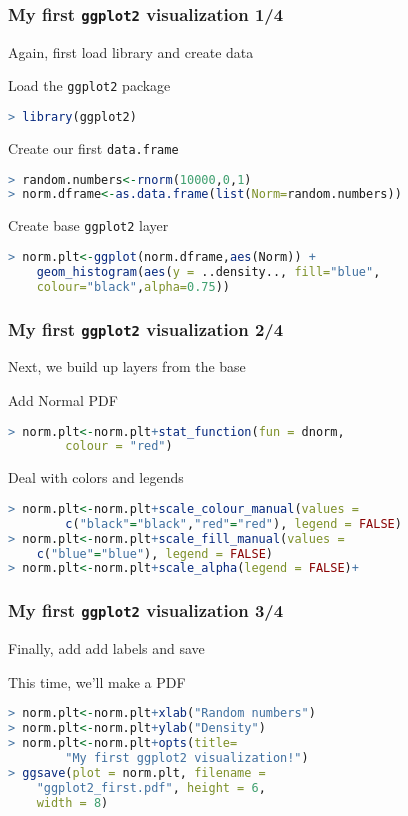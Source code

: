 \documentclass[xcolor=dvipsnames, 9pt]{beamer}
\begin{document}
\begin{frame}[fragile]
    \frametitle{My first \texttt{ggplot2} visualization 1/4}
    Again, first load library and create data
    \begin{block}{Load the \texttt{ggplot2} package}
        \begin{lstlisting}[language=R]
> library(ggplot2)
        \end{lstlisting}
    \end{block}
    \begin{block}{Create our first \texttt{data.frame}}
        \begin{lstlisting}[language=R]
> random.numbers<-rnorm(10000,0,1)
> norm.dframe<-as.data.frame(list(Norm=random.numbers))
        \end{lstlisting}
    \end{block}
    \begin{block}{Create base \texttt{ggplot2} layer}
        \begin{lstlisting}[language=R]
> norm.plt<-ggplot(norm.dframe,aes(Norm)) + 
    geom_histogram(aes(y = ..density.., fill="blue", 
    colour="black",alpha=0.75))
        \end{lstlisting}
    \end{block}
\end{frame}

\begin{frame}[fragile]
    \frametitle{My first \texttt{ggplot2} visualization 2/4}
    Next, we build up layers from the base
    \begin{block}{Add Normal PDF}
        \begin{lstlisting}[language=R]
> norm.plt<-norm.plt+stat_function(fun = dnorm, 
        colour = "red")
        \end{lstlisting}
    \end{block} 
    \begin{block}{Deal with colors and legends}
        \begin{lstlisting}[language=R]
> norm.plt<-norm.plt+scale_colour_manual(values = 
        c("black"="black","red"="red"), legend = FALSE)
> norm.plt<-norm.plt+scale_fill_manual(values = 
    c("blue"="blue"), legend = FALSE) 
> norm.plt<-norm.plt+scale_alpha(legend = FALSE)+
        \end{lstlisting}
    \end{block}
\end{frame}

\begin{frame}[fragile]
    \frametitle{My first \texttt{ggplot2} visualization 3/4}
    Finally, add add labels and save
    \begin{block}{This time, we'll make a PDF}
        \begin{lstlisting}[language=R]
> norm.plt<-norm.plt+xlab("Random numbers")
> norm.plt<-norm.plt+ylab("Density")
> norm.plt<-norm.plt+opts(title=
        "My first ggplot2 visualization!")
> ggsave(plot = norm.plt, filename = 
    "ggplot2_first.pdf", height = 6, 
    width = 8)
        \end{lstlisting}
    \end{block}
\end{frame}
\end{document}
